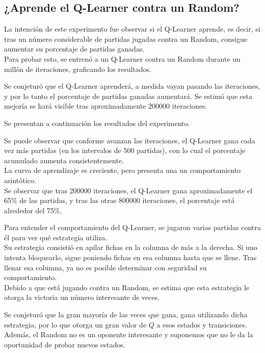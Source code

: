 \subsection{¿Aprende el Q-Learner contra un Random?}

La intención de este experimento fue observar si el Q-Learner aprende, es decir, si tras un número considerable de partidas jugadas contra un Random, consigue aumentar su porcentaje de partidas ganadas.\\
Para probar esto, se entrenó a un Q-Learner contra un Random durante un millón de iteraciones, graficando los resultados.

Se conjeturó que el Q-Learner aprenderá, a medida vayan pasando las iteraciones, y por lo tanto el porcentaje de partidas ganadas aumentará. Se estimó que esta mejoría se hará visible tras aproximadamente 200000 iteraciones.

Se presentan a continuación los resultados del experimento.



Se puede observar que conforme avanzan las iteraciones, el Q-Learner gana cada vez m\'as partidas (en los intervalos de 500 partidas), con lo cual el porcentaje acumulado aumenta consistentemente.\\
La curva de aprendizaje es creciente, pero presenta una un comportamiento asintótico. \\
Se observar que tras 200000 iteraciones, el Q-Learner gana aproximadamente el 65\% de las partidas, y tras las otras 800000 iteraciones, el porcentaje está alrededor del 75\%.

Para entender el comportamiento del Q-Learner, se jugaron varias partidas contra él para ver qué estrategia utiliza. \\
Su estrategia consistió en apilar fichas en la columna de más a la derecha. Si uno intenta bloquearlo, sigue poniendo fichas en esa columna hasta que se llene. Tras llenar esa columna, ya no es posible determinar con seguridad su comportamiento. \\
Debido a que está jugando contra un Random, se estima que esta estrategia le otorga la victoria un número interesante de veces.

Se conjeturó que la gran mayoría de las veces que gana, gana utilizando dicha estrategia, por lo que otorga un gran valor de $Q$ a esos estados y transiciones. Además, el Random no es un oponente interesante y suponemos que no le da la oportunidad de probar nuevos estados.

